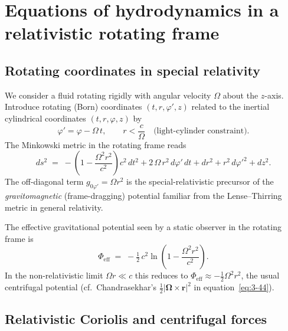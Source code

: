 \section{Equations of hydrodynamics in a relativistic rotating frame}
\label{sec:rel-3-21}

\subsection{Rotating coordinates in special relativity}

We consider a fluid rotating rigidly with angular velocity $\Omega$
about the $z$-axis.  Introduce rotating (Born) coordinates
$(t,r,\varphi',z)$ related to the inertial cylindrical coordinates
$(t,r,\varphi,z)$ by
\begin{equation}\label{eq:rel-3-11}
  \varphi' = \varphi - \Omega\,t,
  \qquad
  r < \frac{c}{\Omega}
  \quad\text{(light-cylinder constraint)}.
\end{equation}
The Minkowski metric in the rotating frame reads
\begin{equation}\label{eq:rel-3-12}
  ds^{2} \;=\;
  -\left(1 - \frac{\Omega^{2}r^{2}}{c^{2}}\right)c^{2}\,dt^{2}
  + 2\,\Omega\,r^{2}\,d\varphi'\,dt
  + dr^{2}
  + r^{2}\,d\varphi'^{2}
  + dz^{2}.
\end{equation}
The off-diagonal term $g_{0\varphi'} = \Omega r^{2}$ is the
special-relativistic precursor of the \emph{gravitomagnetic}
(frame-dragging) potential familiar from the Lense--Thirring metric
in general relativity.

The effective gravitational potential seen by a static observer in
the rotating frame is
\begin{equation}\label{eq:rel-3-13}
  \Phi_{\text{eff}}
  \;=\;
  -\tfrac{1}{2}\,c^{2}\ln\!\left(1 - \frac{\Omega^{2}r^{2}}{c^{2}}\right).
\end{equation}
In the non-relativistic limit $\Omega r \ll c$ this reduces to
$\Phi_{\text{eff}} \approx -\frac{1}{2}\Omega^{2}r^{2}$,
the usual centrifugal potential
(cf.\ Chandrasekhar's $\frac{1}{2}|\boldsymbol{\Omega}\times\mathbf{r}|^{2}$
in equation~\eqref{eq:3-44}).

\subsection{Relativistic Coriolis and centrifugal forces}

